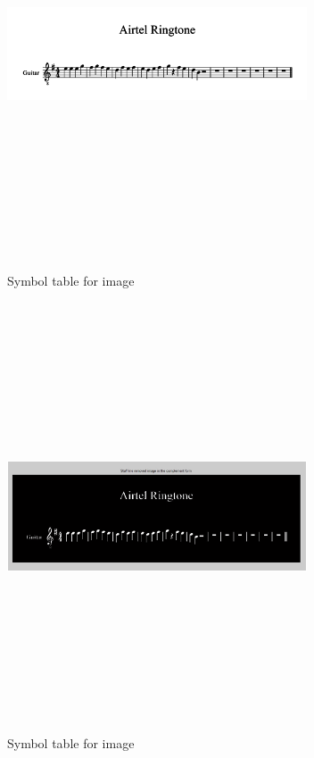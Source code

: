 \documentclass[journal]{IEEEtran}
\begin{document}
\begin{figure}
\includegraphics[width=3.5in,height=5.0in,clip,keepaspectratio]{resources/results/airtel}
\centering
\caption{Symbol table for image}
\end{figure}

\begin{figure}
\includegraphics[width=3.5in,height=5.0in,clip,keepaspectratio]{resources/results/airtel_staff_line_removed}
\centering
\caption{Symbol table for image}
\end{figure}
\end{document}
